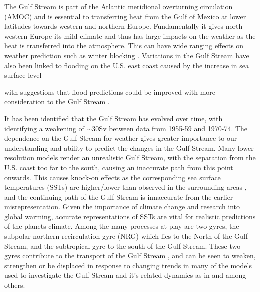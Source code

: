 \documentclass[..\EOYR.tex]{subfiles}
\begin{document}
The Gulf Stream is part of the Atlantic meridional overturning circulation (AMOC) and is essential to transferring heat from the Gulf of Mexico at lower latitudes towards western and northern Europe.
Fundamentally it gives north-western Europe its mild climate and thus has large impacts on the weather as the heat is transferred into the atmosphere.
This can have wide ranging effects on weather prediction such as winter blocking \citep{Scaife2011a}.
Variations in the Gulf Stream have also been linked to flooding on the U.S. east coast caused by the increase in sea surface level \citep{Ezer2015} with suggestions that flood predictions could be improved with more consideration to the Gulf Stream \citep{Ezer2014}. \par
It has been identified that the Gulf Stream has evolved over time, with \citep{Greatbatch1991} identifying a weakening of $\sim$30Sv between data from 1955-59 and 1970-74.
The dependence on the Gulf Stream for weather gives greater importance to our understanding and ability to predict the changes in the Gulf Stream.
Many lower resolution models render an unrealistic Gulf Stream, 
with the separation from the U.S. coast too far to the south, causing an inaccurate path from this point onwards.
This causes knock-on effects as the corresponding sea surface temperatures (SSTs) are higher/lower than observed in the surrounding areas \citep{Greatbatch2004},
 and the continuing path of the Gulf Stream is innaccurate from the earlier misrepresentation.
Given the importance of climate change and research into global warming, accurate representations of SSTs are vital for realistic predictions of the planets climate.
Among the many processes at play are two gyres, the %
subpolar 
northern recirculation gyre (NRG) which lies to the North of the Gulf Stream, and the subtropical gyre to the south of the Gulf Stream. These two gyres contribute to the transport of the Gulf Stream \citep{Hogg1986}, and can be seen to weaken, strengthen or be displaced in response to changing trends in many of the models used to investigate the Gulf Stream and it's related dynamics as in \citep{Greatbatch1991} and \citep{Zhang2007} among others.
\end{document}
